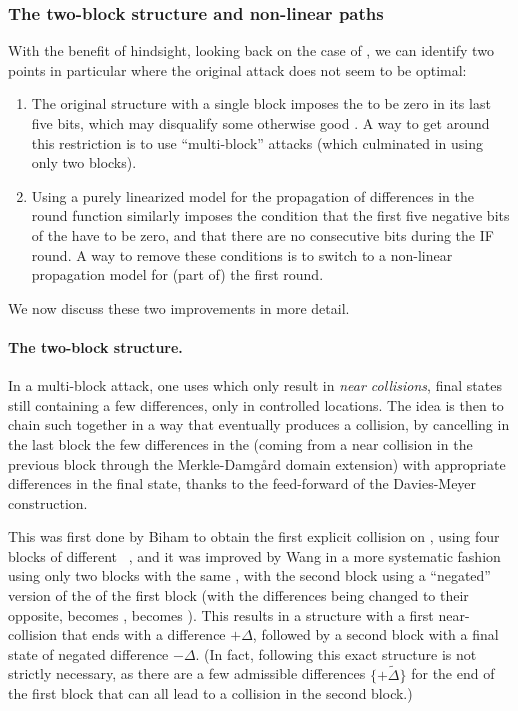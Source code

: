 \subsubsection{The two-block structure and non-linear paths}
\label{sec:nl_struct}
With the benefit of hindsight, looking back on the case of \shazero, we can identify two points in particular where the original attack does not seem to be optimal:
\begin{enumerate}
\item The original structure with a single block imposes the \dv to be zero in its last five bits, which may disqualify some otherwise good
\dvs. A way to get around this restriction is to use ``multi-block'' attacks (which culminated in using only two blocks).
\item Using a purely linearized model for the propagation of differences in the round function similarly imposes the condition that the first
five negative bits of the \dv have to be zero, and that there are no consecutive bits during the IF round. A way to remove these conditions
is to switch to a non-linear propagation model for (part of) the first round.
\end{enumerate} 
We now discuss these two improvements in more detail.

\paragraph{The two-block structure.}
In a multi-block attack, one uses \dvs which only result in \emph{near collisions},
\ie final states still containing a few differences, only in controlled locations. The idea is then to chain such \dvs together in a way
that eventually produces a collision, by cancelling in the last block the few differences in the \iv (coming from a near collision in the previous block
through the Merkle-Damg\aa rd domain extension) with appropriate differences in the final state, thanks to the feed-forward of the
Davies-Meyer construction.

This was first done by Biham \etal to obtain the first explicit collision on \shazero, using four blocks of different
\dvs~\cite{DBLP:conf/eurocrypt/BihamCJCLJ05},
and it was improved by Wang \etal in a more systematic fashion using only two blocks with the same \dv, with the second block using a ``negated'' version
of the \dv of the first block (\ie with the differences being changed to their opposite, \eg \onediffu becomes \onediffd, \nodiffo becomes \nodiffz).
This results in a structure with a first near-collision that ends with a difference $+\Delta$, followed by a second block with a final state
of negated difference $-\Delta$. (In fact,
following this exact structure is not strictly necessary, as there are a few admissible differences $\{+\widetilde{\Delta}\}$ for the end of the first block
that can all lead to a collision in the second block.)

